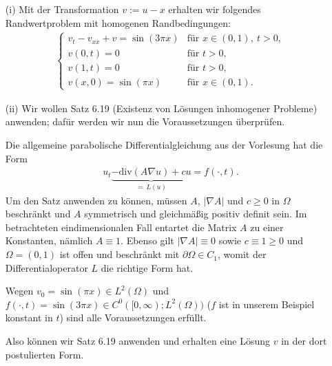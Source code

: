 \begin{solution}

\phantom{} \begin{itemize}
    \item[(i)] Mit der Transformation $v := u - x$ erhalten wir folgendes Randwertproblem mit homogenen Randbedingungen:
    \begin{align}\label{rwp}
        \begin{cases}
            v_t - v_{xx} + v = \sin(3\pi x) & \text{für~} x \in (0, 1),~ t > 0,\\
            v(0, t) = 0 & \text{für~} t > 0,\\
            v(1, t) = 0 & \text{für~} t > 0,\\
            v(x, 0) = \sin(\pi x) & \text{für~} x \in (0, 1).
        \end{cases}
    \end{align}

    \item[(ii)] Wir wollen Satz 6.19 (Existenz von Lösungen inhomogener Probleme) anwenden; dafür werden wir nun die Voraussetzungen überprüfen.

    Die allgemeine parabolische Differentialgleichung aus der Vorlesung hat die Form
    \begin{align*}
        u_t \underbrace{- \mathrm{div}(A \nabla u) + cu}_{=~ L(u)} = f(\cdot, t).
    \end{align*}
    Um den Satz anwenden zu können, müssen $A$, $|\nabla A|$ und $c \geq 0$ in $\Omega$ beschränkt und $A$ symmetrisch und gleichmäßig positiv definit sein.
    Im betrachteten eindimensionalen Fall entartet die Matrix $A$ zu einer Konstanten, nämlich $A \equiv 1.$ Ebenso gilt $|\nabla A| \equiv 0$ sowie $c \equiv 1 \geq 0$ und $\Omega = (0,1)$
    ist offen und beschränkt mit $\partial\Omega \in C_1$, womit der Differentialoperator $L$ die richtige Form hat.

    Wegen $v_0 = \sin(\pi x) \in L^2(\Omega)$ und $f(\cdot,t) = \sin(3\pi x) \in C^0([0, \infty); L^2(\Omega))$ ($f$ ist in unserem Beispiel konstant in $t$) sind alle Voraussetzungen erfüllt.

    Also können wir Satz 6.19 anwenden und erhalten eine Lösung $v$ in der dort postulierten Form.


\end{itemize}
\end{solution}
